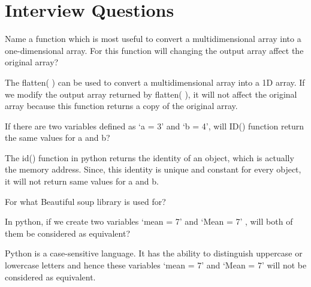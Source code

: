 	\chapter{Interview Questions}

	\resetquestioncounter{}
	\begin{qanda}
		\begin{question}
Name a function which is most useful to convert a multidimensional array into a one-dimensional array. For this function will changing the output array affect the original array?
		\end{question}
		\begin{answer}
The flatten( ) can be used to convert a multidimensional array into a 1D array. If we modify the output array returned by flatten( ), it will not affect the original array because this function returns a copy of the original array.
		\end{answer}
	\end{qanda}

	\begin{qanda}
		\begin{question}
 If there are two variables defined as `a = 3' and `b = 4', will ID() function return the same values for a and b?
		\end{question}
		\begin{answer}
The id() function in python returns the identity of an object, which is actually the memory address. Since, this identity is unique and constant for every object, it will not return same values for a and b.
		\end{answer}
	\end{qanda}

	\begin{qanda}
		\begin{question}
For what Beautiful soup library is used for?
		\end{question}
		\begin{answer}

		\end{answer}
	\end{qanda}

	\begin{qanda}
		\begin{question}
In python, if we create two variables `mean = 7' and `Mean = 7' , will both of them be considered as equivalent?
		\end{question}
		\begin{answer}
Python is a case-sensitive language.  It has the ability to distinguish uppercase or lowercase letters and hence these variables `mean = 7' and `Mean = 7' will not be considered as equivalent.
		\end{answer}
	\end{qanda}


